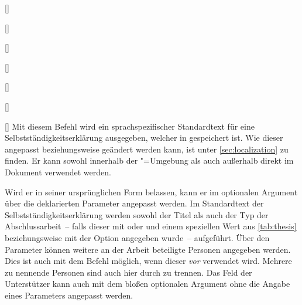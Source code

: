 \begin{Declaration}{}
\begin{Declaration}{[]}
\begin{Declaration}{[]}
\begin{Declaration}{[]}
\begin{Declaration}{[]}
\begin{Declaration}[v2.02]{%
  []%
}
\begin{Declaration}[v2.02]{%
  []%
}
\begin{Declaration}{[\PSet]}
\printdeclarationlist%
%
%
Mit diesem Befehl wird ein sprachspezifischer Standardtext für eine 
Selbstständigkeitserklärung ausgegeben, welcher in  
gespeichert ist. Wie dieser angepasst beziehungsweise geändert werden kann, ist 
unter \autoref{sec:localization} zu finden. Er kann sowohl innerhalb der 
"=Umgebung als auch außerhalb direkt im Dokument 
verwendet werden. 

Wird er in seiner ursprünglichen Form belassen, kann er im optionalen Argument 
über die deklarierten Parameter angepasst werden. Im Standardtext der 
Selbstständigkeitserklärung werden sowohl der Titel als auch der Typ der 
Abschlussarbeit~-- falls dieser mit  oder  und 
einem speziellen Wert aus \autoref{tab:thesis} beziehungsweise mit der Option 
 angegeben wurde~-- aufgeführt. Über den Parameter 
 können weitere an der Arbeit beteiligte 
Personen angegeben werden. Dies ist auch mit dem Befehl  
möglich, wenn dieser \emph{vor}  verwendet wird. Mehrere 
zu nennende Personen sind auch hier durch  zu trennen. Das Feld der 
Unterstützer kann auch mit dem bloßen optionalen Argument ohne die Angabe eines 
Parameters angepasst werden.


\end{Declaration}
\end{Declaration}
\end{Declaration}
\end{Declaration}
\end{Declaration}
\end{Declaration}
\end{Declaration}
\end{Declaration}
